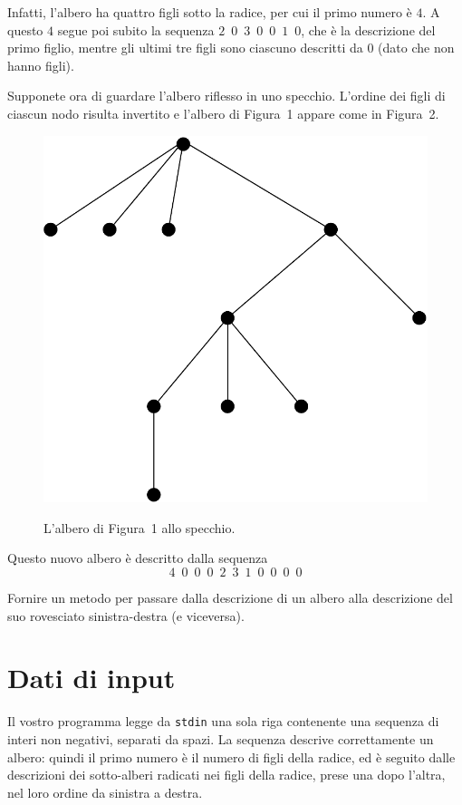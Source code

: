 \documentclass[a4paper,11pt]{article}
\begin{document}
Infatti, l'albero ha quattro figli sotto la radice, per cui il primo numero \`e $4$. A questo $4$ segue poi subito la sequenza $2\,\,\,0\,\,\,3\,\,\,0\,\,\,0\,\,\,1\,\,\,0$, che \`e la descrizione del primo figlio, mentre gli ultimi tre figli sono ciascuno descritti da $0$ (dato che non hanno figli).

Supponete ora di guardare l'albero riflesso in uno specchio. L'ordine dei figli di ciascun nodo risulta invertito e l'albero di Figura~1 appare come in Figura~2.

\begin{figure}[h!]
  \centering
    \includegraphics[scale=0.3]{figs/fig2.pdf}\\
    \caption{L'albero di Figura~1 allo specchio.}
\end{figure}

Questo nuovo albero \`e descritto dalla sequenza
\[
4\,\,\,0\,\,\,0\,\,\,0\,\,\,2\,\,\,3\,\,\,1\,\,\,0\,\,\,0\,\,\,0\,\,\,0
\]

Fornire un metodo per passare dalla descrizione di un albero alla descrizione del suo rovesciato sinistra-destra (e viceversa).


\section*{Dati di input}

Il vostro programma legge da \verb'stdin' una sola riga contenente una sequenza di interi non negativi, separati da spazi. La sequenza descrive correttamente un albero: quindi il primo numero \`e il numero di figli della radice, ed \`e seguito dalle descrizioni dei sotto-alberi radicati nei figli della radice, prese una dopo l'altra, nel loro ordine da sinistra a destra.
\end{document}
